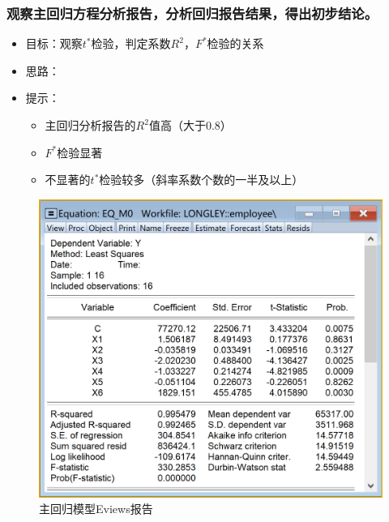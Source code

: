 \documentclass[12pt,(landscape,a4paper),(portrait,a4paper)]{article}
\providecommand{\tightlist}{%
  \setlength{\itemsep}{0pt}\setlength{\parskip}{0pt}}
\begin{document}
\subsubsection{观察主回归方程分析报告，分析回归报告结果，得出初步结论。}

\begin{itemize}
\tightlist
\item
  目标：观察\(t^{\ast}\)检验，判定系数\(R^2\)，\(F^{\ast}\)检验的关系
\item
  思路：
\item
  提示：

  \begin{itemize}
  \tightlist
  \item
    主回归分析报告的\(R^2\)值高（大于0.8）
  \item
    \(F^{\ast}\)检验显著
  \item
    不显著的\(t^\ast\)检验较多（斜率系数个数的一半及以上）
  \end{itemize}
\end{itemize}

\begin{figure}

{\centering \includegraphics[width=8in]{picture/lab5-multilinearity/1-report-main} 

}

\caption{主回归模型Eviews报告}\label{fig:fig-main-report}
\end{figure}
\end{document}
